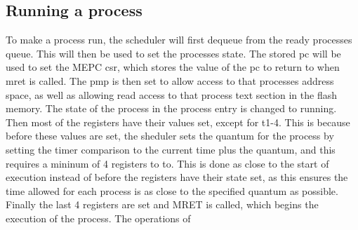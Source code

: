 \subsection{Running a process}
To make a process run, the scheduler will first dequeue from the ready processes queue. This will then be used to set the processes state. The stored pc will be used to set the MEPC csr, which stores the value of the pc to return to when mret is called. The \ac{pmp} is then set to allow access to that processes address space, as well as allowing read access to that process text section in the flash memory. The state of the process in the process entry is changed to running. Then most of the registers have their values set, except for t1-4. This is because before these values are set, the sheduler sets the quantum for the process by setting the timer comparison to the current time plus the quantum, and this requires a mininum of 4 registers to to. This is done as close to the start of execution instead of before the registers have their state set, as this ensures the time allowed for each process is as close to the specified quantum as possible. Finally the last 4 registers are set and MRET is called, which begins the execution of the process. The operations of 
